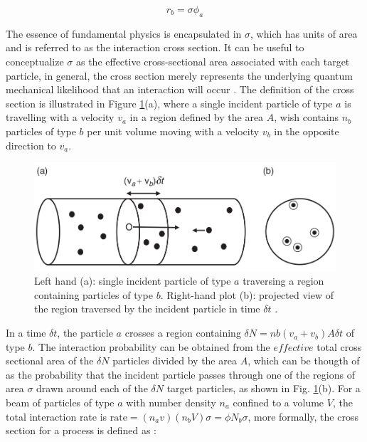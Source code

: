 \begin{equation*}
  r_{b}=\sigma \phi_{a}
\end{equation*}

The essence of fundamental physics is encapsulated in $\sigma$, which has units of area and is referred to as the interaction cross section. It can be useful to conceptualize $\sigma$ as the effective cross-sectional area associated with each target particle, in general, the cross section merely represents the underlying quantum mechanical likelihood that an interaction will occur \cite{thomson_2013}. The definition of the cross section is illustrated in Figure \ref{cross_section}(a), where a single incident particle of type $a$ is travelling with a velocity $v_{a}$ in a region defined by the area $A$, wish contains $n_{b}$ particles of type $b$ per unit volume moving with a velocity $v_{b}$ in the opposite direction to $v_{a}$. 


\begin{center}
  \begin{figure}[h!]
    \centering
\includegraphics[scale=.35]{Chapter1/cross_section.png} 
 \caption[Cross section illustration]{Left hand (a): single incident particle of type $a$ traversing a region containing particles of type $b$. Right-hand plot (b): projected view of the region traversed by the incident particle in time $\delta t$ \cite{thomson_2013}.}
    \label{cross_section}
  \end{figure}
\end{center}

In  a time $\delta t$, the particle $a$  crosses a region containing $\delta N= nb(v_{a}+v_{b}) A \delta t$ of type $b$. The interaction probability can be obtained from the $effective$ total cross sectional area of the $\delta N$ particles divided by the area $A$, which can be thougth of as the probability that the incident particle passes through one of the regions of area $\sigma$ drawn around each of the $\delta N$ target particles, as shown in Fig. \ref{cross_section}(b). For a beam of particles of type $a$ with number density $n_{a}$ confined to a volume $V$, the total interaction rate is $\text{rate}=(n_{a}v)(n_{b}V) \sigma = \phi N_{b} \sigma$,  more formally, the cross section for a process is defined as \cite{thomson_2013}:

